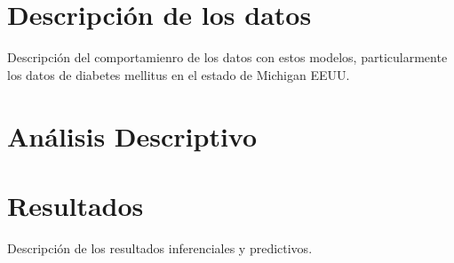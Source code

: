\section{Descripci\'on de los datos}
Descripci\'on del comportamienro de los datos con estos modelos, particularmente los datos de diabetes mellitus en el estado de Michigan EEUU.

\section{An\'alisis Descriptivo}

\section{Resultados}
Descripci\'on de los resultados inferenciales y predictivos.
